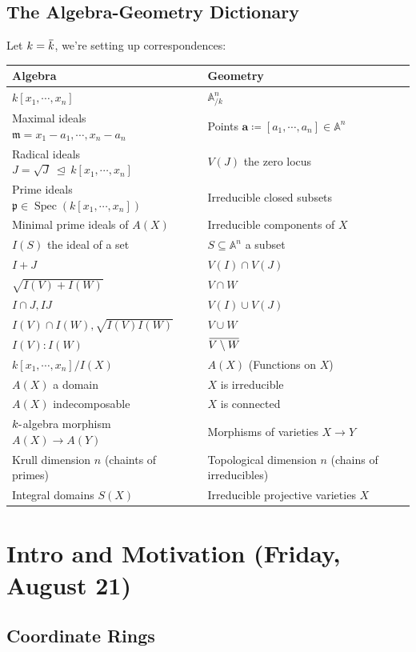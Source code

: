\hypertarget{the-algebra-geometry-dictionary}{%
\subsection{The Algebra-Geometry
Dictionary}\label{the-algebra-geometry-dictionary}}

Let \(k=\mkern 1.5mu\overline{\mkern-1.5muk\mkern-1.5mu}\mkern 1.5mu\),
we're setting up correspondences:

\begin{longtable}[]{@{}ll@{}}
\toprule
Algebra & Geometry\tabularnewline
\midrule
\endhead
\(k[x_1, \cdots, x_{n}]\) & \({\mathbb{A}}^n_{/k}\)\tabularnewline
Maximal ideals \(\mathfrak{m}={x_1 - a_1, \cdots, x_n - a_n}\) & Points
\(\mathbf{a} \coloneqq{\left[ {a_1, \cdots, a_n} \right]} \in {\mathbb{A}}^n\)\tabularnewline
Radical ideals \(J = \sqrt{J} {~\trianglelefteq~}k[x_1, \cdots, x_{n}]\)
& \(V(J)\) the zero locus\tabularnewline
Prime ideals
\(\mathfrak{p}\in \operatorname{Spec}(k[x_1, \cdots, x_{n}])\) &
Irreducible closed subsets\tabularnewline
Minimal prime ideals of \(A(X)\) & Irreducible components of
\(X\)\tabularnewline
\(I(S)\) the ideal of a set & \(S \subseteq {\mathbb{A}}^n\) a
subset\tabularnewline
\(I + J\) & \(V(I) \cap V(J)\)\tabularnewline
\(\sqrt{I(V) + I(W)}\) & \(V\cap W\)\tabularnewline
\(I \cap J, IJ\) & \(V(I) \cup V(J)\)\tabularnewline
\(I(V) \cap I(W), \sqrt{I(V)I(W)}\) & \(V \cup W\)\tabularnewline
\(I(V) : I(W)\) &
\(\mkern 1.5mu\overline{\mkern-1.5muV\setminus W\mkern-1.5mu}\mkern 1.5mu\)\tabularnewline
\(k[x_1, \cdots, x_{n}]/I(X)\) & \(A(X)\) (Functions on
\(X\))\tabularnewline
\(A(X)\) a domain & \(X\) is irreducible\tabularnewline
\(A(X)\) indecomposable & \(X\) is connected\tabularnewline
\(k{\hbox{-}}\)algebra morphism \(A(X)\to A(Y)\) & Morphisms of
varieties \(X\to Y\)\tabularnewline
Krull dimension \(n\) (chaints of primes) & Topological dimension \(n\)
(chains of irreducibles)\tabularnewline
Integral domains \(S(X)\) & Irreducible projective varieties
\(X\)\tabularnewline
\bottomrule
\end{longtable}

\hypertarget{intro-and-motivation-friday-august-21}{%
\section{Intro and Motivation (Friday, August
21)}\label{intro-and-motivation-friday-august-21}}

\hypertarget{coordinate-rings}{%
\subsection{Coordinate Rings}\label{coordinate-rings}}

